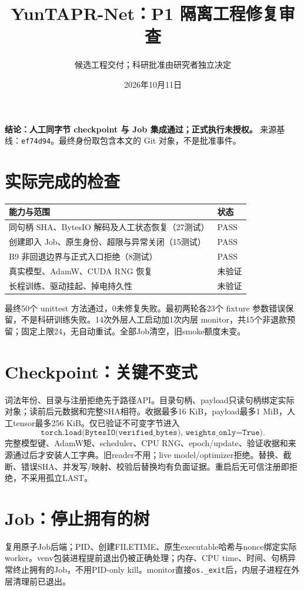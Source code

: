 \documentclass[UTF8,a4paper,10pt]{ctexart}
\title{YunTAPR-Net：P1 隔离工程修复审查}
\author{候选工程交付；科研批准由研究者独立决定}
\date{2026年10月11日}
\begin{document}
\pagestyle{plain}
\maketitle
\vspace{-8mm}
\textbf{结论：人工同字节 checkpoint 与 Job 集成通过；正式执行未授权。}
来源基线：\texttt{ef74d94}。最终身份取包含本文的 Git 对象，不是批准事件。

\section*{实际完成的检查}
\begin{tabular}{p{97mm}p{30mm}}
\toprule
能力与范围 & 状态\\
\midrule
同句柄 SHA、BytesIO 解码及人工状态恢复（27测试） & PASS\\
创建即入 Job、原生身份、超限与异常关闭（15测试） & PASS\\
B9 非回退边界与正式入口拒绝（8测试） & PASS\\
真实模型、AdamW、CUDA RNG 恢复 & 未验证\\
长程训练、驱动挂起、掉电持久性 & 未验证\\
\bottomrule
\end{tabular}

最终50个 unittest 方法通过，0未修复失败。最初两轮各23个 fixture 参数错误保留，不是科研训练失败。14次外层人工启动加1次内层 monitor，共15个非退款预留；固定上限24，无自动重试。全部Job清空，旧smoke额度未变。

\section*{Checkpoint：关键不变式}
词法年份、目录与注册拒绝先于路径API。目录句柄、payload只读句柄绑定实际对象；读前后元数据和完整SHA相符。收据最多16 KiB，payload最多1 MiB，人工tensor最多256 KiB。仅已验证不可变字节进入
\[
\texttt{torch.load(BytesIO(verified\_bytes), weights\_only=True)}.
\]
完整模型键、AdamW矩、scheduler、CPU RNG、epoch/update、验证收据和来源通过后才安装人工字典。旧reader不用；live model/optimizer拒绝。替换、截断、错误SHA、并发写/映射、校验后替换均有负面证据。重启后无可信注册即拒绝，不采用孤立LAST。

\section*{Job：停止拥有的树}
复用原子Job后端；PID、创建FILETIME、原生executable哈希与nonce绑定实际worker。venv包装进程提前退出仍被正确处理；内存、CPU time、时间、句柄异常终止拥有的Job，不用PID-only kill。monitor直接\texttt{os.\_exit}后，内层子进程在外层清理前已退出。
\end{document}
